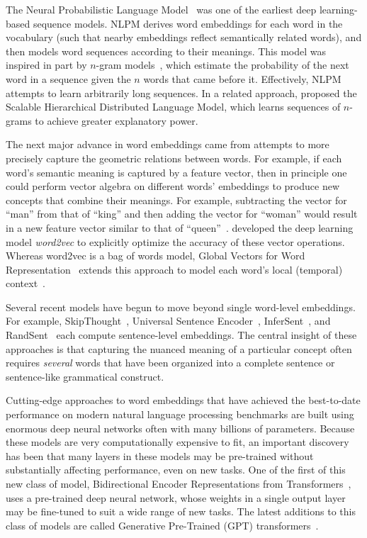 \documentclass{article}
\begin{document}
The Neural Probabilistic Language Model~\citep[NPLM;][]{BengEtal03} was one of the earliest deep learning-based sequence models.  NLPM derives word embeddings for each word in the vocabulary (such that nearby embeddings reflect semantically related words), and then models word sequences according to their meanings.  This model was inspired in part by $n$-gram models~\citep{BrowEtal92}, which estimate the probability of the next word in a sequence given the $n$ words that came before it. Effectively, NLPM attempts to learn arbitrarily long sequences.  In a related approach, \cite{MnihHint09} proposed the Scalable Hierarchical Distributed Language Model, which learns sequences of $n$-grams to achieve greater explanatory power.

The next major advance in word embeddings came from attempts to more precisely capture the geometric relations between words.  For example, if each word's semantic meaning is captured by a feature vector, then in principle one could perform vector algebra on different words' embeddings to produce new concepts that combine their meanings.  For example, subtracting the vector for ``man'' from that of ``king'' and then adding the vector for ``woman'' would result in a new feature vector similar to that of ``queen''~\citep{MikoEtal13b}.  \cite{MikoEtal13a} developed the deep learning model \textit{word2vec} to explicitly optimize the accuracy of these vector operations.  Whereas word2vec is a bag of words model, Global Vectors for Word Representation~\citep[GloVe;][]{PennEtal14} extends this approach to model each word's local (temporal) context~\citep[also see][]{PeteEtal18}.

Several recent models have begun to move beyond single word-level embeddings.  For example, SkipThought~\citep{KiroEtal15}, Universal Sentence Encoder~\citep{CerEtal18}, InferSent~\citep{ConnEtal18}, and RandSent~\citep{WietKiel19} each compute sentence-level embeddings.  The central insight of these approaches is that capturing the nuanced meaning of a particular concept often requires \textit{several} words that have been organized into a complete sentence or sentence-like grammatical construct.

Cutting-edge approaches to word embeddings that have achieved the best-to-date performance on modern natural language processing benchmarks are built using enormous deep neural networks often with many billions of parameters.  Because these models are very computationally expensive to fit, an important discovery has been that many layers in these models may be pre-trained without substantially affecting performance, even on new tasks.  One of the first of this new class of model, Bidirectional Encoder Representations from Transformers~\citep[BERT;][]{DevlEtal18}, uses a pre-trained deep neural network, whose weights in a single output layer may be fine-tuned to suit a wide range of new tasks.  The latest additions to this class of models are called Generative Pre-Trained (GPT) transformers~\citep{RadfEtal18, RadfEtal19, BrowEtal20}.
\end{document}
